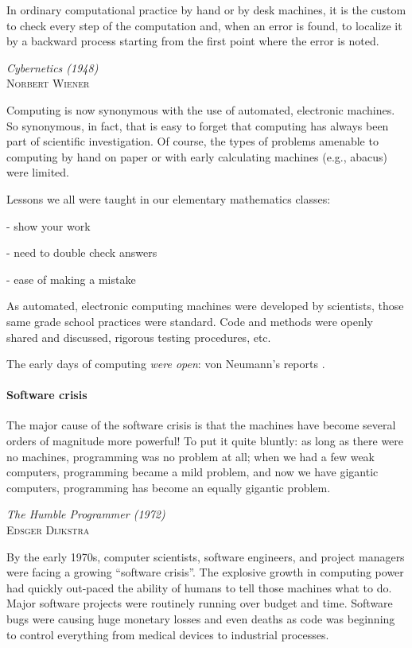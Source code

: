 \documentclass[ChapterTOCs,krantz2]{krantz} %
\begin{document}
\setlength{\epigraphrule}{0pt}
\setlength{\epigraphwidth}{.65\textwidth}
\epigraph%
{%
  In ordinary computational practice by hand or by desk machines, it
  is the custom to check every step of the computation and, when an
  error is found, to localize it by a backward process starting from
  the first point where the error is noted.
}%
{\textit{Cybernetics (1948)}\\ \textsc{Norbert Wiener} }

Computing is now synonymous with the use of automated, electronic machines.  So
synonymous, in fact, that is easy to forget that computing has always been part
of scientific investigation. Of course, the types of problems amenable to
computing by hand on paper or with early calculating machines (e.g., abacus)
were limited. 

Lessons we all were taught in our elementary mathematics classes:

- show your work

- need to double check answers

- ease of making a mistake

As automated, electronic computing machines were developed by scientists,
those same grade school practices were standard.  Code and methods were
openly shared and discussed, rigorous testing procedures, etc.

The early days of computing \emph{were open}: von Neumann's reports
\cite{grcar2011john}.

\paragraph{ {\bf Software crisis}}

\setlength{\epigraphrule}{0pt}
\setlength{\epigraphwidth}{.65\textwidth}
\epigraph%
{%
  The major cause of the software crisis is that the machines have become
  several orders of magnitude more powerful! To put it quite bluntly: as long
  as there were no machines, programming was no problem at all; when we had a
  few weak computers, programming became a mild problem, and now we have
  gigantic computers, programming has become an equally gigantic problem.
}%
{\textit{The Humble Programmer (1972)}\\ \textsc{Edsger Dijkstra} }

By the early 1970s, computer scientists, software engineers, and project
managers were facing a growing ``software crisis''. The explosive growth in
computing power had quickly out-paced the ability of humans to tell those machines
what to do. Major software projects were routinely running over budget and
time. Software bugs were causing huge monetary losses and even deaths as code
was beginning to control everything from medical devices to industrial processes.
\end{document}
